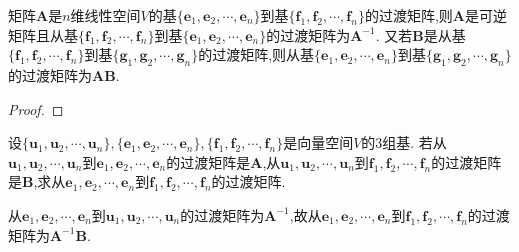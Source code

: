 \documentclass[../../main.tex]{subfiles}%
\begin{document}
\begin{theorem}\label{theorem:两次基变换后的过渡矩阵}
矩阵\(\boldsymbol{A}\)是\(n\)维线性空间\(V\)的基\(\{\boldsymbol{e}_1,\boldsymbol{e}_2,\cdots,\boldsymbol{e}_n\}\)到基\(\{\boldsymbol{f}_1,\boldsymbol{f}_2,\cdots,\boldsymbol{f}_n\}\)的过渡矩阵,则\(\boldsymbol{A}\)是可逆矩阵且从基\(\{\boldsymbol{f}_1,\boldsymbol{f}_2,\cdots,\boldsymbol{f}_n\}\)到基\(\{\boldsymbol{e}_1,\boldsymbol{e}_2,\cdots,\boldsymbol{e}_n\}\)的过渡矩阵为\(\boldsymbol{A}^{-1}\). 又若\(\boldsymbol{B}\)是从基\(\{\boldsymbol{f}_1,\boldsymbol{f}_2,\cdots,\boldsymbol{f}_n\}\)到基\(\{\boldsymbol{g}_1,\boldsymbol{g}_2,\cdots,\boldsymbol{g}_n\}\)的过渡矩阵,则从基\(\{\boldsymbol{e}_1,\boldsymbol{e}_2,\cdots,\boldsymbol{e}_n\}\)到基\(\{\boldsymbol{g}_1,\boldsymbol{g}_2,\cdots,\boldsymbol{g}_n\}\)的过渡矩阵为\(\boldsymbol{A}\boldsymbol{B}\).
\end{theorem}
\begin{proof}



\end{proof}

\begin{example}
设\(\{\boldsymbol{u}_1,\boldsymbol{u}_2,\cdots,\boldsymbol{u}_n\},\{\boldsymbol{e}_1,\boldsymbol{e}_2,\cdots,\boldsymbol{e}_n\},\{\boldsymbol{f}_1,\boldsymbol{f}_2,\cdots,\boldsymbol{f}_n\}\)是向量空间\(V\)的3组基. 若从\(\boldsymbol{u}_1,\boldsymbol{u}_2,\cdots,\boldsymbol{u}_n\)到\(\boldsymbol{e}_1,\boldsymbol{e}_2,\cdots,\boldsymbol{e}_n\)的过渡矩阵是\(\boldsymbol{A}\),从\(\boldsymbol{u}_1,\boldsymbol{u}_2,\cdots,\boldsymbol{u}_n\)到\(\boldsymbol{f}_1,\boldsymbol{f}_2,\cdots,\boldsymbol{f}_n\)的过渡矩阵是\(\boldsymbol{B}\),求从\(\boldsymbol{e}_1,\boldsymbol{e}_2,\cdots,\boldsymbol{e}_n\)到\(\boldsymbol{f}_1,\boldsymbol{f}_2,\cdots,\boldsymbol{f}_n\)的过渡矩阵.
\end{example}
\begin{solution}

从\(\boldsymbol{e}_1,\boldsymbol{e}_2,\cdots,\boldsymbol{e}_n\)到\(\boldsymbol{u}_1,\boldsymbol{u}_2,\cdots,\boldsymbol{u}_n\)的过渡矩阵为\(\boldsymbol{A}^{-1}\),故从\(\boldsymbol{e}_1,\boldsymbol{e}_2,\cdots,\boldsymbol{e}_n\)到\(\boldsymbol{f}_1,\boldsymbol{f}_2,\cdots,\boldsymbol{f}_n\)的过渡矩阵为\(\boldsymbol{A}^{-1}\boldsymbol{B}\).


\end{solution}
\end{document}
